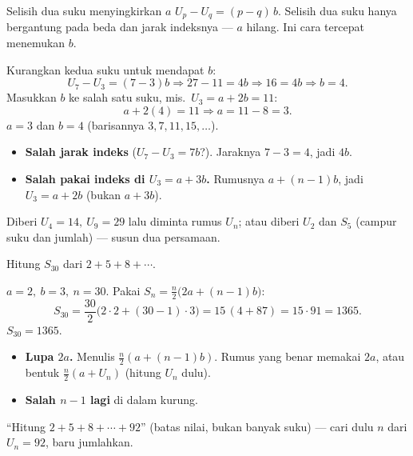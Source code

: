 \begin{ingat}{Selisih dua suku menyingkirkan $a$}
$U_p - U_q = (p-q)\,b$. Selisih dua suku hanya bergantung pada beda dan jarak
indeksnya --- $a$ hilang. Ini cara tercepat menemukan $b$.
\end{ingat}

\jawab
{} Kurangkan kedua suku untuk mendapat $b$:
\[
U_7 - U_3 = (7-3)b \Rightarrow 27-11 = 4b \Rightarrow 16 = 4b \Rightarrow b=4.
\]
 Masukkan $b$ ke salah satu suku, mis.\ $U_3=a+2b=11$:
\[
a + 2(4) = 11 \Rightarrow a = 11-8 = 3.
\]
\jadi $a=3$ dan $b=4$ (barisannya $3,7,11,15,\dots$).

\begin{jebakan}
\begin{itemize}[leftmargin=*,topsep=2pt]
  \item \textbf{Salah jarak indeks} ($U_7-U_3=7b$?). Jaraknya $7-3=4$, jadi $4b$.
  \item \textbf{Salah pakai indeks di $U_3=a+3b$.} Rumusnya $a+(n-1)b$, jadi
  $U_3=a+2b$ (bukan $a+3b$).
\end{itemize}
\end{jebakan}

\begin{variasi}
Diberi $U_4=14,\ U_9=29$ lalu diminta rumus $U_n$; atau diberi $U_2$ dan $S_5$
(campur suku dan jumlah) --- susun dua persamaan.
\end{variasi}

\begin{soalbox}{}
Hitung $S_{30}$ dari $2+5+8+\cdots$.
\end{soalbox}

\jawab
{} $a=2,\ b=3,\ n=30$.
 Pakai $S_n=\frac n2\big(2a+(n-1)b\big)$:
\[
S_{30}=\frac{30}{2}\big(2\cdot2+(30-1)\cdot3\big)=15\,(4+87)=15\cdot91=1365.
\]
\jadi $S_{30}=1365$.

\begin{jebakan}
\begin{itemize}[leftmargin=*,topsep=2pt]
  \item \textbf{Lupa $2a$.} Menulis $\frac n2(a+(n-1)b)$. Rumus yang benar
  memakai $2a$, atau bentuk $\frac n2(a+U_n)$ (hitung $U_n$ dulu).
  \item \textbf{Salah $n-1$ lagi} di dalam kurung.
\end{itemize}
\end{jebakan}

\begin{variasi}
``Hitung $2+5+8+\cdots+92$'' (batas nilai, bukan banyak suku) --- cari dulu $n$
dari $U_n=92$, baru jumlahkan.
\end{variasi}

